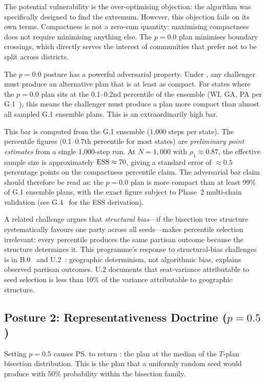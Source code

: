 The potential vulnerability is the over-optimising objection: the algorithm
was specifically designed to find the extremum.
However, this objection fails on its own terms.
Compactness is not a zero-sum quantity: maximising compactness does not
require minimising anything else.
The $p = 0.0$ plan minimises boundary crossings, which directly serves the
interest of communities that prefer not to be split across districts.

The $p = 0.0$ posture has a powerful adversarial property.
Under \karcher{}, any challenger must produce an alternative plan that
is at least as compact.
For states where the $p = 0.0$ plan sits at the 0.1--0.2nd percentile
of the \recom{} ensemble (WI, GA, PA per G.1~\citep{g1paper}), this means
the challenger must produce a plan more compact than almost all sampled
G.1 ensemble plans.
This is an extraordinarily high bar.

This bar is computed from the G.1 \gc{} ensemble (1{,}000 steps per state).
The percentile figures (0.1--0.7th percentile for most states) are
\emph{preliminary point estimates} from a single 1{,}000-step run.
At $N = 1{,}000$ with $\rho_1 \approx 0.87$, the effective sample size is
approximately $\mathrm{ESS} \approx 70$, giving a standard error of $\approx 0.5$
percentage points on the compactness percentile claim.
The adversarial bar claim should therefore be read as: the $p{=}0.0$ plan is
more compact than at least 99\% of G.1 ensemble plans, with the exact
figure subject to Phase~2 multi-chain validation
(see G.4~\citep{dellaLibera2026g4} for the ESS derivation).

A related challenge argues that \emph{structural bias}---if the bisection
tree structure systematically favours one party across all seeds---makes
percentile selection irrelevant: every percentile produces the same partisan
outcome because the structure determines it.
This programme's response to structural-bias challenges is in
B.0~\cite{b0paper} and U.2~\cite{b17paper}:
geographic determinism, not algorithmic bias, explains observed partisan
outcomes.
U.2 documents that seat-variance attributable to seed selection is less
than 10\% of the variance attributable to geographic structure.

\subsection{Posture 2: Representativeness Doctrine ($p = 0.5$)}

Setting $p = 0.5$ causes \ps{} to return \ms{}: the plan at the median of
the $T$-plan bisection distribution.
This is the plan that a uniformly random seed would produce with 50\%
probability within the bisection family.


